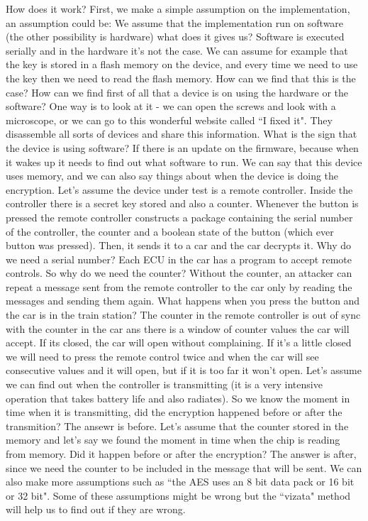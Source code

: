 How does it work? First, we make a simple assumption on the implementation, an
assumption could be: We assume that the implementation run on software (the
other possibility is hardware) what does it gives us? Software is executed
serially and in the hardware it's not the case. We can assume for example that
the key is stored in a flash memory on the device, and every time we need to use
the key then we need to read the flash memory. How can we find that this is the
case? How can we find first of all that a device is on using the hardware or the
software? One way is to look at it - we can open the screws and look with a
microscope, or we can go to this wonderful website called ``I fixed it". They
disassemble all sorts of devices and share this information. What is the sign
that the device is using software? If there is an update on the firmware,
because when it wakes up it needs to find out what software to run. We can say
that this device uses memory, and we can also say things about when the 
device is doing the encryption. 
Let's assume the device under test is a remote controller.
Inside the controller there is a secret key stored and also a counter. Whenever
the button is pressed the remote controller constructs a package containing the
serial number of the controller, the counter and a boolean state of the
button (which ever button was pressed). Then, it sends it to a car and the car
decrypts it. Why do we need a serial number? Each ECU in the car has a 
program to accept remote controls. So why do we need the counter? Without the
counter, an attacker can repeat a message sent from the remote controller to the
car only by reading the messages and sending them again. What happens when you
press the button and the car is in the train station? The counter in the remote
controller is out of sync with the counter in the car ans there is a window of
counter values the car will accept. If its closed, the car will open without
complaining. If it's a little closed we will need to press the remote control
twice and when the car will see consecutive values and it will open,
 but if it is too far it won't open. 
 Let's assume we can find out when the controller is
transmitting (it is a very intensive operation that takes battery life and also
radiates). So we know the moment in time when it is transmitting, did the
encryption happened before or after the transmition? The ansewr is before. Let's
assume that the counter stored in the memory and let's say we found the moment in
time when the chip is reading from memory. Did it happen before or after the
encryption? The answer is after, since we need the counter to be included in the
message that will be sent. We can also make more assumptions such as ``the AES
uses an 8 bit data pack or 16 bit or 32 bit". Some of these assumptions might be
wrong but the ``vizata" method will help us to find out if they are wrong. 

